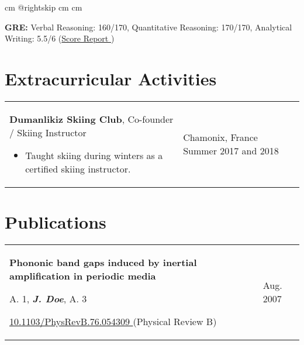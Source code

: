 \documentclass[10pt, a4paper]{article}
\newenvironment{highlights}{
        \begin{itemize}[
                topsep=0pt,
                parsep=0.07 cm,
                partopsep=0pt,
                itemsep=0pt,
                after=\vspace{-1\baselineskip},
                leftmargin=0.6 cm + 3pt
            ]
    }{
        \end{itemize}
    } %
\let\hrefWithoutArrow\href
\renewcommand{\href}[2]{\hrefWithoutArrow{#1}{#2 \raisebox{.15ex}{\footnotesize \faExternalLink*}}}
\begin{document}
            \par\endgroup

        \vspace{0.12 cm}
            \begingroup\raggedright
             cm
            \advance\csname @rightskip cm
            \advance{} cm

            \textbf{GRE:} Verbal Reasoning: 160/170, Quantitative Reasoning: 170/170, Analytical Writing: 5.5/6 (\href{https://example.com/}{Score Report})

            \par\endgroup



    \section{Extracurricular Activities}
    
        \begin{tabularx}{ cm-0.13cm}{K{0.2 cm} R{3.6 cm}}
            \textbf{Dumanlikiz Skiing Club}, Co-founder / Skiing Instructor
            \vspace{0.12 cm}
            \begin{highlights}
                \item Taught skiing during winters as a certified skiing instructor. \hspace*{-0.2cm}
            \end{highlights}
        &
            Chamonix, France \newline
            Summer 2017 and 2018
        \end{tabularx}



    \section{Publications}
    
        \begin{tabularx}{ cm-0.13cm}{K{0.2 cm} R{3.6 cm}}
            \textbf{Phononic band gaps induced by inertial amplification in periodic media}

            \vspace{0.07 cm}

            A. 1, \textbf{\textit{J. Doe}}, A. 3

            \vspace{0.07 cm}

            \href{https://doi.org/10.1103/PhysRevB.76.054309}{10.1103/PhysRevB.76.054309} (Physical Review B)
            &
            Aug. 2007

        \end{tabularx}
\end{document}
